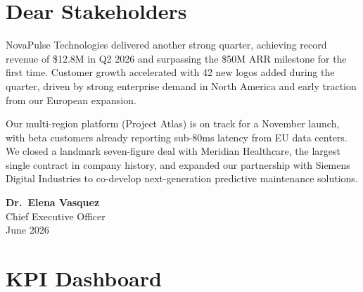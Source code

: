 \documentclass[
    language=english,
    doctype=stakeholder-report,
    institution=none,
]{../../omnilatex}
\begin{document}
\maketitle

\section*{Dear Stakeholders}

NovaPulse Technologies delivered another strong quarter, achieving record
revenue of \$12.8M in Q2 2026 and surpassing the \$50M ARR milestone
for the first time. Customer growth accelerated with 42 new logos added
during the quarter, driven by strong enterprise demand in North America
and early traction from our European expansion.

Our multi-region platform (Project Atlas) is on track for a November
launch, with beta customers already reporting sub-80ms latency from
EU data centers. We closed a landmark seven-figure deal with Meridian
Healthcare, the largest single contract in company history, and expanded
our partnership with Siemens Digital Industries to co-develop next-generation
predictive maintenance solutions.

\vspace{1em}
\noindent\textbf{Dr.\ Elena Vasquez}\\
Chief Executive Officer\\
June 2026

\section{KPI Dashboard}
\end{document}
